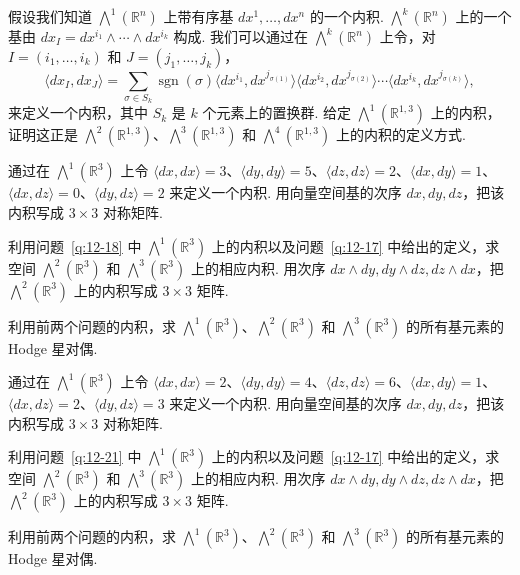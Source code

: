 \begin{question}\label{q:12-17}
假设我们知道 $\bigwedge^1(\mathbb{R}^n)$ 上带有序基 $dx^1,\ldots,dx^n$ 的一个内积. $\bigwedge^k(\mathbb{R}^n)$ 上的一个基由 $dx_I=dx^{i_1}\wedge\cdots\wedge dx^{i_k}$ 构成. 我们可以通过在 $\bigwedge^k(\mathbb{R}^n)$ 上令，对 $I=(i_1,\ldots,i_k)$ 和 $J=(j_1,\ldots,j_k)$，
\[
\langle dx_I,dx_J\rangle=\sum_{\sigma\in S_k}\operatorname{sgn}(\sigma)\langle dx^{i_1},dx^{j_{\sigma(1)}}\rangle\langle dx^{i_2},dx^{j_{\sigma(2)}}\rangle\cdots\langle dx^{i_k},dx^{j_{\sigma(k)}}\rangle,
\]
来定义一个内积，其中 $S_k$ 是 $k$ 个元素上的置换群. 给定 $\bigwedge^1(\mathbb{R}^{1,3})$ 上的内积，证明这正是 $\bigwedge^2(\mathbb{R}^{1,3})$、$\bigwedge^3(\mathbb{R}^{1,3})$ 和 $\bigwedge^4(\mathbb{R}^{1,3})$ 上的内积的定义方式.
\end{question}

\begin{question}\label{q:12-18}
通过在 $\bigwedge^1(\mathbb{R}^3)$ 上令 $\langle dx,dx\rangle=3$、$\langle dy,dy\rangle=5$、$\langle dz,dz\rangle=2$、$\langle dx,dy\rangle=1$、$\langle dx,dz\rangle=0$、$\langle dy,dz\rangle=2$ 来定义一个内积. 用向量空间基的次序 $dx,dy,dz$，把该内积写成 $3\times3$ 对称矩阵.
\end{question}

\begin{question}\label{q:12-19}
利用问题~\ref{q:12-18} 中 $\bigwedge^1(\mathbb{R}^3)$ 上的内积以及问题~\ref{q:12-17} 中给出的定义，求空间 $\bigwedge^2(\mathbb{R}^3)$ 和 $\bigwedge^3(\mathbb{R}^3)$ 上的相应内积. 用次序 $dx\wedge dy,dy\wedge dz,dz\wedge dx$，把 $\bigwedge^2(\mathbb{R}^3)$ 上的内积写成 $3\times3$ 矩阵.
\end{question}

\begin{question}\label{q:12-20}
利用前两个问题的内积，求 $\bigwedge^1(\mathbb{R}^3)$、$\bigwedge^2(\mathbb{R}^3)$ 和 $\bigwedge^3(\mathbb{R}^3)$ 的所有基元素的 Hodge 星对偶.
\end{question}

\begin{question}\label{q:12-21}
通过在 $\bigwedge^1(\mathbb{R}^3)$ 上令 $\langle dx,dx\rangle=2$、$\langle dy,dy\rangle=4$、$\langle dz,dz\rangle=6$、$\langle dx,dy\rangle=1$、$\langle dx,dz\rangle=2$、$\langle dy,dz\rangle=3$ 来定义一个内积. 用向量空间基的次序 $dx,dy,dz$，把该内积写成 $3\times3$ 对称矩阵.
\end{question}

\begin{question}\label{q:12-22}
利用问题~\ref{q:12-21} 中 $\bigwedge^1(\mathbb{R}^3)$ 上的内积以及问题~\ref{q:12-17} 中给出的定义，求空间 $\bigwedge^2(\mathbb{R}^3)$ 和 $\bigwedge^3(\mathbb{R}^3)$ 上的相应内积. 用次序 $dx\wedge dy,dy\wedge dz,dz\wedge dx$，把 $\bigwedge^2(\mathbb{R}^3)$ 上的内积写成 $3\times3$ 矩阵.
\end{question}

\begin{question}\label{q:12-23}
利用前两个问题的内积，求 $\bigwedge^1(\mathbb{R}^3)$、$\bigwedge^2(\mathbb{R}^3)$ 和 $\bigwedge^3(\mathbb{R}^3)$ 的所有基元素的 Hodge 星对偶.
\end{question}
